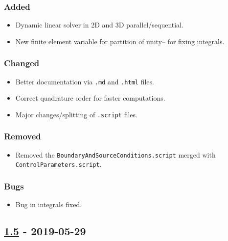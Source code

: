 \subsubsection{Added}

\begin{itemize}
\tightlist
\item
  Dynamic linear solver in 2D and 3D parallel/sequential.
\item
  New finite element variable for partition of unity-- for fixing
  integrals.
\end{itemize}

\subsubsection{Changed}

\begin{itemize}
\tightlist
\item
  Better documentation via \lstinline!.md! and \lstinline!.html! files.
\item
  Correct quadrature order for faster computations.
\item
  Major changes/splitting of \lstinline!.script! files.
\end{itemize}

\subsubsection{Removed}

\begin{itemize}
\tightlist
\item
  Removed the \lstinline!BoundaryAndSourceConditions.script! merged with
  \lstinline!ControlParameters.script!.
\end{itemize}

\subsubsection{Bugs}

\begin{itemize}
\tightlist
\item
  Bug in integrals fixed.
\end{itemize}

\subsection{\texorpdfstring{\href{https://gitlab.com/PsdSolver/psd_sources/-/tree/v1.5}{1.5}
- 2019-05-29}{1.5 - 2019-05-29}}

